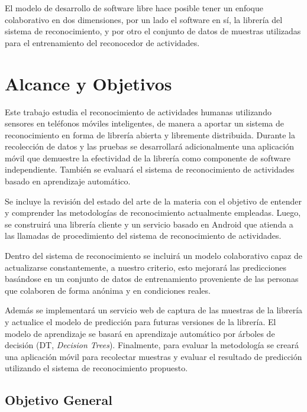 El modelo de desarrollo de software libre hace posible tener un enfoque
colaborativo en dos dimensiones, por un lado el software en sí, la
librería del sistema de reconocimiento, y por otro el conjunto de
datos de muestras utilizadas para el entrenamiento del reconocedor
de actividades.

\section{Alcance y Objetivos}

\label{alcance-y-objetivos}

Este trabajo estudia el reconocimiento de actividades humanas utilizando
sensores en teléfonos móviles inteligentes, de manera a aportar un
sistema de reconocimiento en forma de librería abierta y libremente
distribuida. Durante la recolección de datos y las pruebas se desarrollará
adicionalmente una aplicación móvil que demuestre la efectividad de
la librería como componente de software independiente. También se
evaluará el sistema de reconocimiento de actividades basado en aprendizaje
automático.

Se incluye la revisión del estado del arte de la materia con el objetivo
de entender y comprender las metodologías de reconocimiento actualmente
empleadas. Luego, se construirá una librería cliente y un servicio
basado en Android que atienda a las llamadas de procedimiento del
sistema de reconocimiento de actividades. 

Dentro del sistema de reconocimiento se incluirá un modelo colaborativo
capaz de actualizarse constantemente, a nuestro criterio, esto mejorará
las predicciones basándose en un conjunto de datos de entrenamiento
proveniente de las personas que colaboren de forma anónima y en condiciones
reales.

Además se implementará un servicio web de captura de las muestras
de la librería y actualice el modelo de predicción para futuras versiones
de la librería. El modelo de aprendizaje se basará en aprendizaje
automático por árboles de decisión (DT,
\emph{Decision Trees}). Finalmente, para evaluar la metodología se
creará una aplicación móvil para recolectar muestras y evaluar el
resultado de predicción utilizando el sistema de reconocimiento propuesto.

\subsection{Objetivo General}

